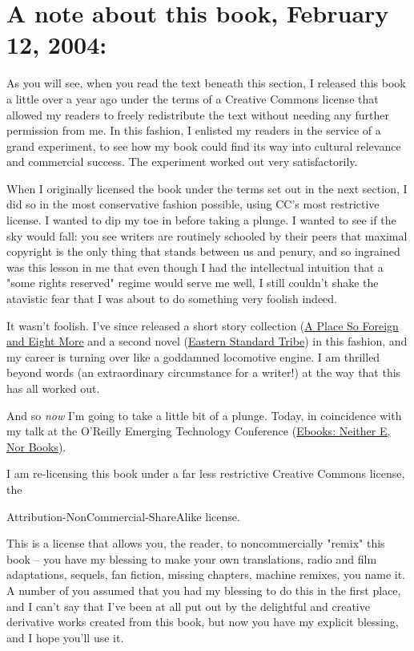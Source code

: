 \section{A note about this book, February 12, 2004:}

As you will see, when you read the text beneath this section, I
released this book a little over a year ago under the terms of a
Creative Commons license that allowed my readers to freely
redistribute the text without needing any further permission from
me. In this fashion, I enlisted my readers in the service of a
grand experiment, to see how my book could find its way into
cultural relevance and commercial success. The experiment worked
out very satisfactorily.

When I originally licensed the book under the terms set out in the
next section, I did so in the most conservative fashion possible,
using CC's most restrictive license. I wanted to dip my toe in
before taking a plunge. I wanted to see if the sky would fall: you
see writers are routinely schooled by their peers that maximal
copyright is the only thing that stands between us and penury, and
so ingrained was this lesson in me that even though I had the
intellectual intuition that a "some rights reserved" regime would
serve me well, I still couldn't shake the atavistic fear that I was
about to do something very foolish indeed.

It wasn't foolish. I've since released a short story collection
(\href{http://craphound.com/place}{A Place So Foreign and Eight More}
and a second novel
(\href{http://craphound.com/est}{Eastern Standard Tribe}) in this
fashion, and my career is turning over like a goddamned locomotive
engine. I am thrilled beyond words (an extraordinary circumstance
for a writer!) at the way that this has all worked out.

And so \emph{now} I'm going to take a little bit of a plunge.
Today, in coincidence with my talk at the O'Reilly Emerging
Technology Conference
(\href{http://conferences.oreillynet.com/cs/et2004/view/e\_sess/4693}{Ebooks: Neither E, Nor Books}).

I am re-licensing this book under a far less restrictive Creative
Commons license, the 
\begin{center}
Attribution-NonCommercial-ShareAlike license.
\end{center}
This is a license that allows you, the reader, to noncommercially
"remix" this book -- you have my blessing to make your own
translations, radio and film adaptations, sequels, fan fiction,
missing chapters, machine remixes, you name it. A number of you
assumed that you had my blessing to do this in the first place, and
I can't say that I've been at all put out by the delightful and
creative derivative works created from this book, but now you have
my explicit blessing, and I hope you'll use it.

